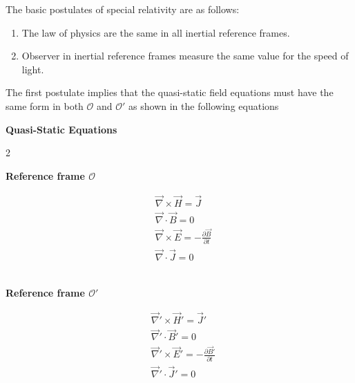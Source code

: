 \documentclass[12pt,a4paper,oneside]{book}
\begin{document}
\begin{onehalfspace}
The basic postulates of special relativity are as follows:
\begin{enumerate}
	\item The law of physics are the same in all inertial reference frames.
	\item Observer in inertial reference frames measure the same value for the 
	speed of light.
\end{enumerate}
The first postulate implies that the quasi-static field equations must have the 
same form in both  $\mathcal{O}$ and $\mathcal{O'}$ as shown in the following 
equations
\begin{mybox}
	\bigskip
	\centerline{\textbf{Quasi-Static Equations}}
	\begin{multicols}{2}
		\centerline{\textbf{Reference frame $\mathcal{O}$}}
		\begin{equation}
			\begin{aligned}
				&\vec{\nabla}\times\vec{H} = \vec{J} \\[6pt]
				&\vec{\nabla}\cdot\vec{B} = 0 \\[6pt]
				&\vec{\nabla}\times\vec{E} = -\frac{\partial\vec{B}}{\partial 
				t} \\[6pt]
				&\vec{\nabla}\cdot\vec{J} = 0
			\end{aligned}
		\end{equation}
		\ \newline
		\columnbreak
		\ \newline
		\centerline{\textbf{Reference frame $\mathcal{O'}$}}	
		\begin{equation}\label{maxwell_eq_moving_frame}
			\begin{aligned}
				&\vec{\nabla}'\times\vec{H}' = \vec{J}' \\[6pt]
				&\vec{\nabla}'\cdot\vec{B}' = 0 \\[6pt]
				&\vec{\nabla}'\times\vec{E}' = 
				-\frac{\partial\vec{B}'}{\partial t} \\[6pt]
				&\vec{\nabla}'\cdot\vec{J}' = 0
			\end{aligned}
		\end{equation} 
		\ \newline
	\end{multicols}
\end{mybox}


\end{onehalfspace}
\end{document}
